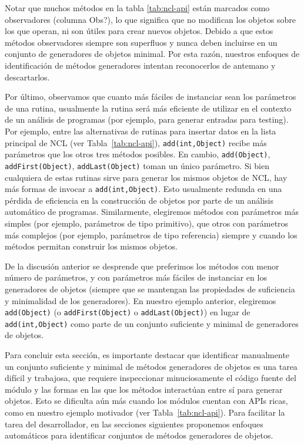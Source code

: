 Notar que muchos métodos en la tabla \ref{tab:ncl-api} están marcados como observadores (columna Obs?), lo que significa que no modifican los objetos sobre los que operan, ni son útiles para crear nuevos objetos. 
Debido a que estos métodos observadores siempre son superfluos y nunca deben incluirse en un conjunto de generadores de objetos minimal. Por esta razón, nuestros enfoques de identificación de métodos generadores intentan reconocerlos de antemano y descartarlos.

Por último, observamos que cuanto más fáciles de instanciar sean los parámetros de una rutina, usualmente la rutina será más eficiente de utilizar en el contexto de un análisis de programas (por ejemplo, para generar entradas para testing). Por ejemplo, entre las alternativas de rutinas para insertar datos en
la lista principal de NCL (ver Tabla~\ref{tab:ncl-api}), \texttt{add(int,Object)} recibe más parámetros que los otros tres métodos posibles. En cambio, \texttt{add(Object)}, \texttt{addFirst(Object)}, \texttt{addLast(Object)} toman un único parámetro. Si bien cualquiera de estas rutinas sirve para generar los mismos objetos de NCL, hay más formas de invocar a \texttt{add(int,Object)}. Esto usualmente redunda en una pérdida de eficiencia en la construcción de objetos por parte de un análisis automático de programas. Similarmente, elegiremos métodos con parámetros más simples (por ejemplo, parámetros de tipo primitivo), que otros con parámetros más complejos (por ejemplo, parámetros de tipo referencia) siempre y cuando los métodos permitan construir los mismos objetos.

De la discusión anterior se desprende que preferimos los métodos con menor número de parámetros, y con parámetros más fáciles de instanciar en los generadores de objetos (siempre que se mantengan las propiedades de suficiencia y minimalidad de los generadores). 
En nuestro ejemplo anterior, elegiremos \texttt{add(Object)} (o \texttt{addFirst(Object)} o \texttt{addLast(Object)}) en lugar de \\
\texttt{add(int,Object)} 
como parte de un conjunto suficiente y minimal de generadores de objetos.

Para concluir esta sección, es importante destacar que identificar manualmente un conjunto suficiente y minimal de métodos generadores de objetos es una tarea difícil y trabajosa, que requiere inspeccionar minuciosamente el código fuente del módulo y las formas en las que los métodos interactúan entre sí para generar objetos. Esto se dificulta aún más cuando los módulos cuentan con APIs ricas, como en nuestro ejemplo motivador (ver Tabla~\ref{tab:ncl-api}). 
Para facilitar la tarea del desarrollador, en las secciones siguientes proponemos enfoques automáticos para identificar conjuntos de métodos generadores de objetos.

